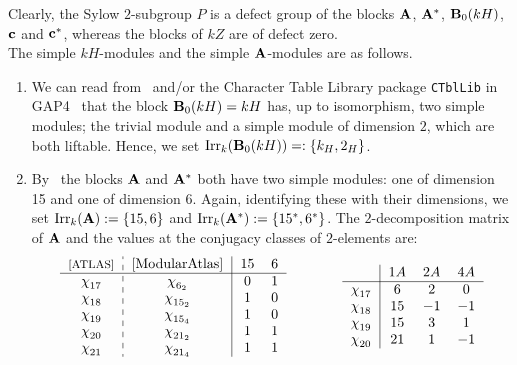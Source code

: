 \begin{nota}
\begin{enumerate}[label=(\arabic*), start=9]
 \end{enumerate} 
Clearly, the Sylow $2$-subgroup $P$ is a defect group of the blocks ${\mathbf{A}}$, ${\mathbf{A}}^\ast$, ${\mathbf{B}}_0(kH)$, ${\mathbf{c}}$ and ${\mathbf{c}}^\ast$, whereas the blocks of $kZ$ are of  defect zero.\\ 
The simple $kH$-modules and the simple ${\mathbf{A}}$-modules are as follows.
\begin{enumerate}[label=(\arabic*),start=10]
    \item\label{nota:simplesInkH} We can read from~\cite[Appendix I.E]{JamesKerberBook} and/or  the Character Table Library package \verb|CTblLib| in GAP4~\cite{GAP} that the block ${\mathbf{B}}_0(kH)=kH$ has, up to isomorphism, two simple modules; the trivial module and a simple module of dimension $2$, which are both liftable. Hence, we set $\operatorname{Irr}_k({\mathbf{B}}_0(kH))=:\{k_H,2_H\}$.
    \item\label{nota:3A72-decompMatrixA} By~\cite[A7mod2, Block~3]{ModularAtlas} the blocks ${\mathbf{A}}$ and ${\mathbf{A}}^\ast$ both have two simple modules: one of dimension 15 and one of dimension 6. Again, identifying these with their dimensions, we set $\operatorname{Irr}_k({\mathbf{A}}):=\{15, 6\}$  and $\operatorname{Irr}_k({\mathbf{A}}^\ast):=\{15^\ast, 6^\ast\}$. The $2$-decomposition matrix of ${\mathbf{A}}$ and the values at the conjugacy classes of $2$-elements are: 
        \[
        \begin{tabular}{c:c|cc}{\footnotesize{\cite[p.10]{ATLAS}}} &  \cite{ModularAtlas} & $15$ & $6$\\
            \hline  
            $\chi^{}_{17}$ & $\chi^{}_{6_2}$  & $0$ & $1$\\
            $\chi^{}_{18}$ & $\chi^{}_{15_2}$ & $1$ & $0$\\
            $\chi^{}_{19}$ & $\chi^{}_{15_4}$ & $1$ & $0$\\
            $\chi^{}_{20}$ & $\chi^{}_{21_2}$ & $1$ & $1$\\
            $\chi^{}_{21}$ & $\chi^{}_{21_4}$ & $1$ & $1$\\
        \end{tabular}
        \qquad \qquad
        \begin{tabular}{c|ccc} &  $1A$ & $2A$ & $4A$\\
            \hline  
            $\chi^{}_{17}$ & $6$  & $2$ & $0$\\
            $\chi^{}_{18}$ & $15$ & $-1$ & $-1$\\
            $\chi^{}_{19}$ & $15$ & $3$ & $1$\\
            $\chi^{}_{20}$ & $21$ & $1$ & $-1$\\

\end{tabular}\]
\end{enumerate}
\end{nota}
